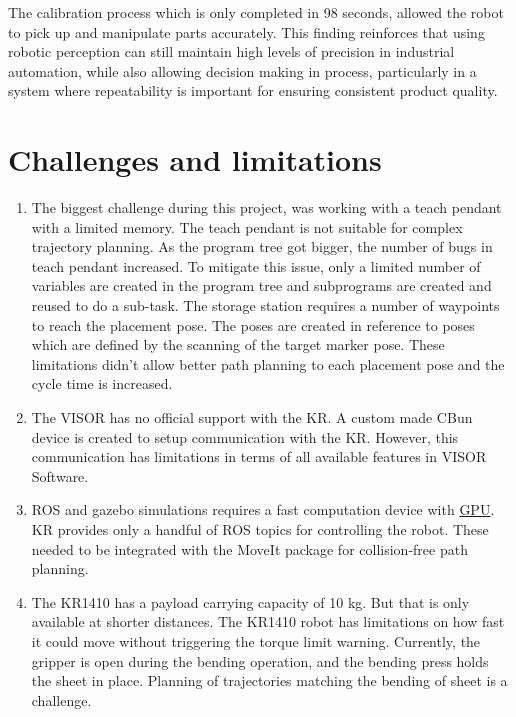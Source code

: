 The calibration process which is only completed in 98 seconds, allowed the robot to pick up and manipulate parts accurately. This finding reinforces that using robotic perception can still maintain high levels of precision in industrial automation, while also allowing decision making in process, particularly in a system where repeatability is important for ensuring consistent product quality.

\section{Challenges and limitations}
\begin{enumerate}
    \item The biggest challenge during this project, was working with a teach pendant with a limited memory. The teach pendant is not suitable for complex trajectory planning. As the program tree got bigger, the number of bugs in teach pendant increased. To mitigate this issue, only a limited number of variables are created in the program tree and subprograms are created and reused to do a sub-task. The storage station requires a number of waypoints to reach the placement pose. The poses are created in reference to poses which are defined by the scanning of the target marker pose. These limitations didn't allow better path planning to each placement pose and the cycle time is increased.
    \item The VISOR has no official support with the KR. A custom made CBun device is created to setup communication with the KR. However, this communication has limitations in terms of all available features in VISOR Software.
    \item ROS and gazebo simulations requires a fast computation device with \hyperref[acro:GPU]{GPU}. KR provides only a handful of ROS topics for controlling the robot. These needed to be integrated with the MoveIt package for collision-free path planning.
    \item The KR1410 has a payload carrying capacity of 10 kg. But that is only available at shorter distances. The KR1410 robot has limitations on how fast it could move without triggering the torque limit warning. Currently, the gripper is open during the bending operation, and the bending press holds the sheet in place. Planning of trajectories matching the bending of sheet is a challenge.
\end{enumerate}

